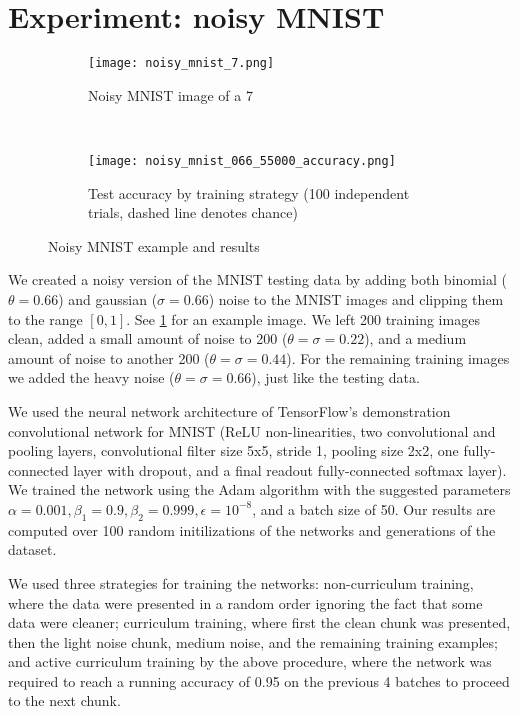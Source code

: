 \documentclass{article}
\begin{document}
\section{Experiment: noisy MNIST}
\begin{figure}
\centering
\begin{subfigure}{0.45\textwidth}
\centering
\texttt{[image: noisy\_mnist\_7.png]}
\caption{Noisy MNIST image of a 7}
\label{noisymnist}
\end{subfigure}
~
\begin{subfigure}{0.5\textwidth}
\centering
\texttt{[image: noisy\_mnist\_066\_55000\_accuracy.png]}
\caption{Test accuracy by training strategy (100 independent trials, dashed line denotes chance)}
\label{accuracyfig}
\end{subfigure}
\caption{Noisy MNIST example and results}
\end{figure}
We created a noisy version of the MNIST testing data by adding both binomial ($\theta = 0.66$) and gaussian ($\sigma=0.66$) noise to the MNIST images and clipping them to the range $[0,1]$. See \ref{noisymnist} for an example image. We left 200 training images clean, added a small amount of noise to 200 ($\theta = \sigma = 0.22$), and a medium amount of noise to another 200 ($\theta = \sigma = 0.44$). For the remaining training images we added the heavy noise ($\theta = \sigma = 0.66$), just like the testing data. \par
We used the neural network architecture of TensorFlow's demonstration convolutional network for MNIST (ReLU non-linearities, two convolutional and pooling layers, convolutional filter size 5x5, stride 1, pooling size 2x2, one fully-connected layer with dropout, and a final readout fully-connected softmax layer). We trained the network using the Adam algorithm with the suggested parameters $\alpha = 0.001, \beta_1 = 0.9, \beta_2 = 0.999, \epsilon = 10^{-8}$, and a batch size of 50. Our results are computed over 100 random initilizations of the networks and generations of the dataset.\par
We used three strategies for training the networks: non-curriculum training, where the data were presented in a random order ignoring the fact that some data were cleaner; curriculum training, where first the clean chunk was presented, then the light noise chunk, medium noise, and the remaining training examples; and active curriculum training by the above procedure, where the network was required to reach a running accuracy of 0.95 on the previous 4 batches to proceed to the next chunk.\par 
\end{document}
